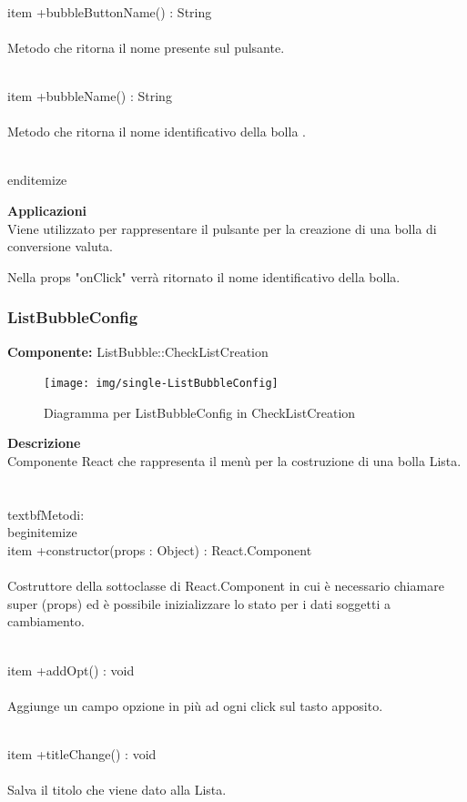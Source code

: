 \\item +bubbleButtonName() : String 
\\\\
Metodo che ritorna il nome presente sul pulsante.

\\item +bubbleName() : String 
\\\\
Metodo che ritorna il nome identificativo della bolla .

\\end{itemize} 


\textbf{Applicazioni}\\
Viene utilizzato per rappresentare il pulsante per la creazione di una bolla di conversione valuta.

Nella props "onClick" verrà ritornato il nome identificativo della bolla. 


\clearpage

\subsubsection{ListBubbleConfig}
\textbf{Componente:}  ListBubble::CheckListCreation\\
   \FloatBarrier
   \begin{figure}[ht]
   \centering
   \texttt{[image: img/single-ListBubbleConfig]}
   \caption{{Diagramma per ListBubbleConfig in CheckListCreation}}
\end{figure}
\FloatBarrier
\textbf{Descrizione}\\
Componente React che rappresenta il menù per la costruzione di una bolla Lista.
\\\\
\\textbf{Metodi:} 
\\begin{itemize}
\\item +constructor(props : Object) : React.Component 
\\\\
Costruttore della sottoclasse di React.Component in cui è necessario chiamare super (props) ed è possibile inizializzare lo stato per i dati soggetti a cambiamento.

\\item +addOpt() : void 
\\\\
Aggiunge un campo opzione in più ad ogni click sul tasto apposito.

\\item +titleChange() : void 
\\\\
Salva il titolo che viene dato alla Lista.

